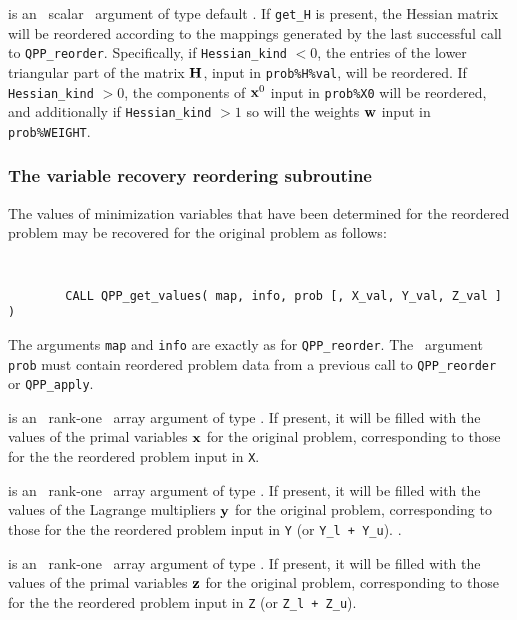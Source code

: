 \documentclass{galahad}
\newcommand{\packagename}{QPP}
\begin{document}
\begin{description}
is an \optional\ scalar \intentin\ argument of type default \logical. 
If {\tt get\_H} is present, the Hessian matrix will be reordered according to the
mappings generated by the last successful call to {\tt \packagename\_reorder}. 
Specifically, if {\tt Hessian\_kind} $< 0$, the entries of the 
lower triangular part of the matrix ${\mathbf{H}}$, input in {\tt prob\%H\%val}, 
will be reordered. If {\tt Hessian\_kind} $> 0$, the 
components of ${\mathbf{x}}^0$ input in {\tt prob\%X0} will be reordered, 
and additionally if {\tt Hessian\_kind} $> 1$ so will the weights 
${\mathbf{w}}$ input in {\tt prob\%WEIGHT}.

\end{description}


\subsubsection{The  variable recovery reordering subroutine}
The values of minimization variables that have been determined for the 
reordered problem may be recovered for the original problem as follows: 
\vspace*{-2mm}
{\tt 
\begin{verbatim}
        CALL QPP_get_values( map, info, prob [, X_val, Y_val, Z_val ] )
\end{verbatim}
}
\vspace*{-1mm}
\noindent
The arguments {\tt map} and {\tt info} are exactly as for 
{\tt \packagename\_reorder}. 
The \intentin\ argument {\tt prob}
must contain reordered problem data from a previous call 
to {\tt QPP\_reorder} or {\tt QPP\_apply}.

\begin{description}
 is an \optional\ rank-one \intentout\ array argument of 
type \realdp. If 
present, it will be filled with the values of the primal variables ${\mathbf{x}}$ 
for the original problem, corresponding to those for the the reordered 
problem input in {\tt X}. 
 
 is an \optional\ rank-one \intentout\ array argument of 
type \realdp. If present, 
it will be filled with the values of the Lagrange multipliers ${\mathbf{y}}$ 
for the original problem, corresponding to those for the the reordered 
problem input in {\tt Y} (or {\tt Y\_l + Y\_u}).
. 
 
 is an \optional\ rank-one \intentout\ array argument of 
type \realdp. If 
present, it will be filled with the values of the primal variables ${\mathbf{z}}$ 
for the original problem, corresponding to those for the the reordered 
problem input in {\tt Z} (or {\tt Z\_l + Z\_u}).
\end{description}
\end{document}
